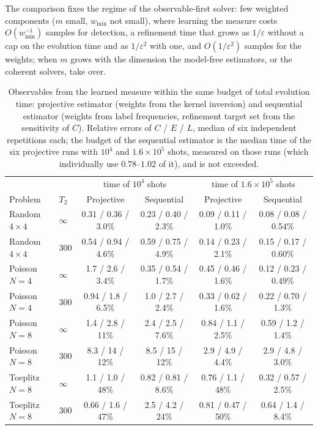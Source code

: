 \documentclass[journal]{IEEEtran}
\begin{document}
The comparison fixes the regime of the observable-first solver: few weighted components ($m$ small, $w_{\min}$ not small), where learning the measure costs $O(w_{\min}^{-1})$ samples for detection, a refinement time that grows as $1/\varepsilon$ without a cap on the evolution time and as $1/\varepsilon^2$ with one, and $O(1/\varepsilon^2)$ samples for the weights; when $m$ grows with the dimension the model-free estimators, or the coherent solvers, take over.

\begin{table}[t]
\caption{Observables from the learned measure within the same budget of total evolution time: projective estimator (weights from the kernel inversion) and sequential estimator (weights from label frequencies, refinement target set from the sensitivity of $C$). Relative errors of $C$ / $E$ / $L$, median of six independent repetitions each; the budget of the sequential estimator is the median time of the six projective runs with $10^4$ and $1.6\times10^5$ shots, measured on those runs (which individually use $0.78$--$1.02$ of it), and is not exceeded.}
\label{tab:qoiseq}
\centering\footnotesize
\begin{tabular}{llcccc}
\toprule
 & & \multicolumn{2}{c}{time of $10^4$ shots} & \multicolumn{2}{c}{time of $1.6\times10^5$ shots}\\
Problem & $T_2$ & Projective & Sequential & Projective & Sequential\\
\midrule
Random $4\times4$ & $\infty$ & 0.31 / 0.36 / 3.0\% & 0.23 / 0.40 / 2.3\% & 0.09 / 0.11 / 1.0\% & 0.08 / 0.08 / 0.54\%\\
Random $4\times4$ & 300 & 0.54 / 0.94 / 4.6\% & 0.59 / 0.75 / 4.9\% & 0.14 / 0.23 / 2.1\% & 0.15 / 0.17 / 0.60\%\\
Poisson $N=4$ & $\infty$ & 1.7 / 2.6 / 3.4\% & 0.35 / 0.54 / 1.7\% & 0.45 / 0.46 / 1.6\% & 0.12 / 0.23 / 0.49\%\\
Poisson $N=4$ & 300 & 0.94 / 1.8 / 6.5\% & 1.0 / 2.7 / 2.4\% & 0.33 / 0.62 / 1.6\% & 0.22 / 0.70 / 1.3\%\\
Poisson $N=8$ & $\infty$ & 1.4 / 2.8 / 11\% & 2.4 / 2.5 / 7.6\% & 0.84 / 1.1 / 2.5\% & 0.59 / 1.2 / 1.4\%\\
Poisson $N=8$ & 300 & 8.3 / 14 / 12\% & 8.5 / 15 / 12\% & 2.9 / 4.9 / 4.4\% & 2.9 / 4.8 / 3.0\%\\
Toeplitz $N=8$ & $\infty$ & 1.1 / 1.0 / 48\% & 0.82 / 0.81 / 8.6\% & 0.76 / 1.1 / 48\% & 0.32 / 0.57 / 2.5\%\\
Toeplitz $N=8$ & 300 & 0.66 / 1.6 / 47\% & 2.5 / 4.2 / 24\% & 0.81 / 0.47 / 50\% & 0.64 / 1.4 / 8.4\%\\
\bottomrule
\end{tabular}
\end{table}
\end{document}
